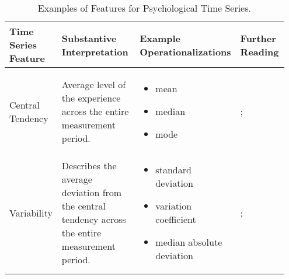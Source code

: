 \begin{sidewaystable*}[!hbtp]
    \centering
    \caption{Examples of Features for Psychological Time Series.}
    \label{tab:esmFeatures} 
    \begin{tabular}{
    >{\raggedright\arraybackslash}p{0.15\linewidth} 
    >{\raggedright\arraybackslash}p{0.35\linewidth} 
    >{\raggedright\arraybackslash}p{0.25\linewidth} 
    >{\raggedright\arraybackslash}p{0.20\linewidth}
    }
        \hline 
        Time Series Feature & Substantive Interpretation & Example Operationalizations & Further Reading \\ 
        \hline \\ [-0.5em]
        
        
        Central Tendency \linebreak & 
        Average level of the experience across the entire measurement period. \linebreak & 
        \vspace{-1em}
        \begin{itemize}[nosep,leftmargin=*,label={--}]
            \item mean
            \item median
            \item mode
        \end{itemize} \linebreak  & 
        \citet{bringmann2018c}; \citet{weisberg1992} \\ 
        
        Variability & 
        Describes the average deviation from the central tendency across the entire measurement period. \linebreak & 
        \vspace{-1em}
        \begin{itemize}[nosep,leftmargin=*,label={--}]
            \item standard deviation
            \item variation coefficient
            \item median absolute deviation
        \end{itemize} \linebreak & 
        \citet{helmich2020a}; \linebreak\citet{vandeleemput2014} \\ 
        

\end{tabular}
\end{sidewaystable*}
